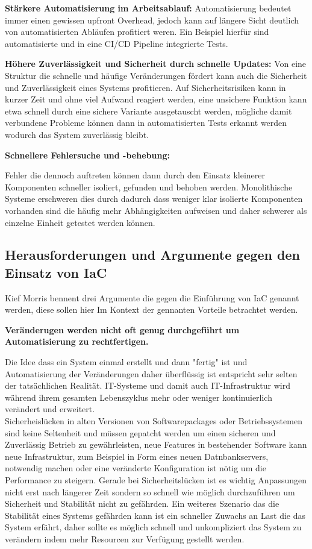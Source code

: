 \textbf{Stärkere Automatisierung im Arbeitsablauf:} Automatisierung
bedeutet immer einen gewissen upfront Overhead, jedoch kann auf
längere Sicht deutlich von automatisierten Abläufen profitiert weren.
Ein Beispiel hierfür sind automatisierte und in eine CI/CD Pipeline
integrierte Tests.

\textbf{Höhere Zuverlässigkeit und Sicherheit durch schnelle Updates:}
Von eine Struktur die schnelle und häufige Veränderungen fördert
kann auch die Sicherheit und Zuverlässigkeit eines Systems profitieren.
Auf Sicherheitsrisiken kann in kurzer Zeit und ohne viel Aufwand
reagiert werden, eine unsichere Funktion kann etwa schnell durch
eine sichere Variante ausgetauscht werden, mögliche damit verbundene
Probleme können dann in automatisierten Tests erkannt werden wodurch
das System zuverlässig bleibt.

\textbf{Schnellere Fehlersuche und -behebung:}

Fehler die dennoch auftreten können dann durch den Einsatz kleinerer
Komponenten schneller isoliert, gefunden und behoben werden.
Monolithische Systeme erschweren dies durch dadurch dass weniger klar
isolierte Komponenten vorhanden sind die häufig mehr Abhängigkeiten
aufweisen und daher schwerer als einzelne Einheit getestet werden können.

\subsection{Herausforderungen und Argumente gegen den Einsatz von IaC}

Kief Morris bennent drei Argumente die gegen die Einführung von IaC
genannt werden, diese sollen hier Im Kontext der gennanten Vorteile betrachtet
werden.

\textbf{Veränderugen werden nicht oft genug durchgeführt um
Automatisierung zu rechtfertigen.}

Die Idee dass ein System einmal erstellt und dann "fertig" ist und
Automatisierung der Veränderungen daher überflüssig ist 
entspricht sehr selten der tatsächlichen Realität.
IT-Systeme und damit auch IT-Infrastruktur wird während ihrem gesamten
Lebenszyklus mehr oder weniger kontinuierlich verändert und erweitert.\\
Sicherheislücken in alten Versionen von Softwarepackages oder
Betriebssystemen sind keine Seltenheit und müssen gepatcht werden um
einen sicheren und Zuverlässig Betrieb zu gewährleisten, neue Features
in bestehender Software kann neue Infrastruktur, zum Beispiel in Form eines
neuen Datnbankservers, notwendig machen oder eine veränderte Konfiguration
ist nötig um die Performance zu steigern. Gerade bei Sicherheitslücken
ist es wichtig Anpassungen nicht erst nach längerer Zeit sondern so
schnell wie möglich durchzuführen um Sicherheit und Stabilität nicht
zu gefährden. Ein weiteres Szenario das die Stabilität eines Systems
gefährden kann ist ein schneller Zuwachs an Last die das System erfährt,
daher sollte es möglich schnell und unkompliziert das System zu verändern
indem mehr Resourcen zur Verfügung gestellt werden.

